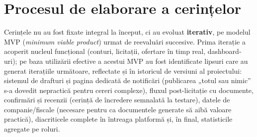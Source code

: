 \section{Procesul de elaborare a cerințelor}

Cerințele nu au fost fixate integral la început, ci au evoluat \textbf{iterativ}, pe modelul MVP (\textit{minimum viable product}) urmat de reevaluări succesive. Prima iterație a acoperit nucleul funcțional (conturi, licitații, ofertare în timp real, dashboard-uri); pe baza utilizării efective a acestui MVP au fost identificate lipsuri care au generat iterațiile următoare, reflectate și în istoricul de versiuni al proiectului: sistemul de drafturi și pagina dedicată de notificări (publicarea „totul sau nimic'' s-a dovedit nepractică pentru cereri complexe), fluxul post-licitație cu documente, confirmări și recenzii (cerință de încredere semnalată la testare), datele de companie/fiscale (necesare pentru ca documentele generate să aibă valoare practică), diacriticele complete în întreaga platformă și, în final, statisticile agregate pe roluri.

